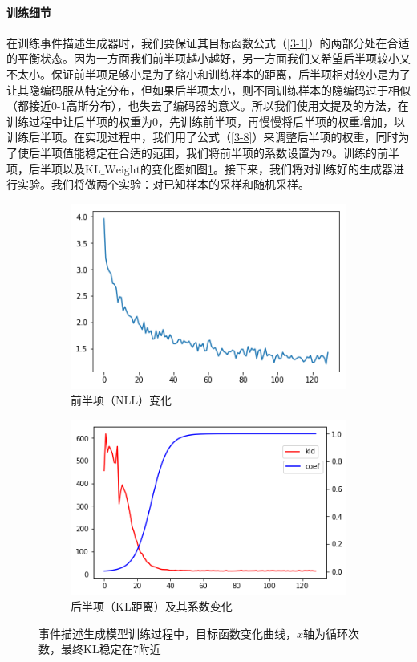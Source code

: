 \documentclass[]{template}
\begin{document}
\paragraph{训练细节}
在训练事件描述生成器时，我们要保证其目标函数公式（\ref{3-1}）的两部分处在合适的平衡状态。因为一方面我们前半项越小越好，另一方面我们又希望后半项较小又不太小。保证前半项足够小是为了缩小和训练样本的距离，后半项相对较小是为了让其隐编码服从特定分布，但如果后半项太小，则不同训练样本的隐编码过于相似（都接近0-1高斯分布），也失去了编码器的意义。所以我们使用文提及的方法，在训练过程中让后半项的权重为0，先训练前半项，再慢慢将后半项的权重增加，以训练后半项。在实现过程中，我们用了公式（\ref{3-8}）来调整后半项的权重，同时为了使后半项值能稳定在合适的范围，我们将前半项的系数设置为79。训练的前半项，后半项以及$\mathrm{KL\_Weight}$的变化图如图\ref{f3-2}。接下来，我们将对训练好的生成器进行实验。我们将做两个实验：对已知样本的采样和随机采样。

\begin{figure}[htb]
    \centering
	\begin{subfigure}{.4\textwidth}
		\includegraphics[width=\textwidth]{ce.png}
		\caption{前半项（$\mathrm{NLL}$）变化}
	\end{subfigure}
	\begin{subfigure}{.425\textwidth}
		\includegraphics[width=\textwidth]{ceof.png}
		\caption{后半项（$\mathrm{KL}$距离）及其系数变化}
    \end{subfigure}
    \caption{事件描述生成模型训练过程中，目标函数变化曲线，$x$轴为循环次数，最终$\mathrm{KL}$稳定在7附近}
    \label{f3-2}
\end{figure}
\end{document}
